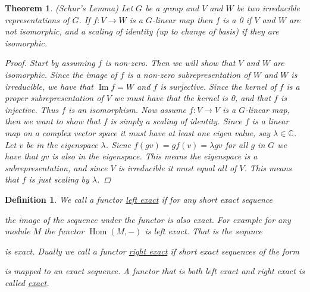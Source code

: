 \documentclass[11pt, a4paper, english]{article}
\numberwithin{prop}{section}
\numberwithin{lemma}{section}
\newtheorem{theorem}{Theorem}
\numberwithin{theorem}{section}
\newtheorem{defin}{Definition}
\numberwithin{defin}{section}
\numberwithin{example}{section}
\newcommand{\C}{\mathbb{C}}
\DeclareMathOperator{\Hom}{Hom}
\DeclareMathOperator{\Image}{Im}
\begin{document}
\begin{appendices}
\begin{theorem}
\label{schur}
(Schur's Lemma) Let $G$ be a group and $V$ and $W$ be two irreducible representations of $G$. If $f:V \to W$ is a $G$-linear map then $f$ is a 0 if $V$ and $W$ are not isomorphic, and a scaling of identity (up to change of basis) if they are isomorphic.
\begin{proof}
Start by assuming $f$ is non-zero. Then we will show that $V$ and $W$ are isomorphic. Since the image of $f$ is a non-zero subrepresentation of $W$ and $W$ is irreducible, we have that $\Image f = W$ and $f$ is surjective. Since the kernel of $f$ is a proper subrepresentation of $V$ we must have that the kernel is 0, and that $f$ is injective. Thus $f$ is an isomorphism.
Now assume $f: V \to V$ is a $G$-linear map, then we want to show that $f$ is simply a scaling of identity. Since $f$ is a linear map on a complex vector space it must have at least one eigen value, say $\lambda \in \C$. Let $v$ be in the eigenspace $\lambda$. Sicne $f(gv) = g f(v) = \lambda gv$ for all $g$ in $G$ we have that $gv$ is also in the eigenspace. This means the eigenspace is a subrepresentation, and since $V$ is irreducible it must equal all of $V$. This means that $f$ is just scaling by $\lambda$.
\end{proof}
\end{theorem}

\begin{defin}
\label{def:exact_functor}
We call a functor \underline{left exact} if for any short exact sequence
\begin{center}
\end{center}
the image of the sequence under the functor is also exact. For example for any module $M$ the functor $\Hom(M, -)$ is left exact. That is the sequnce
\begin{center}
\end{center}
is exact. Dually we call a functor \underline{right exact} if short exact sequences of the form
\begin{center}
\end{center}
is mapped to an exact sequence. A functor that is both left exact and right exact is called \underline{exact}.
\end{defin}


\end{appendices}
\end{document}
